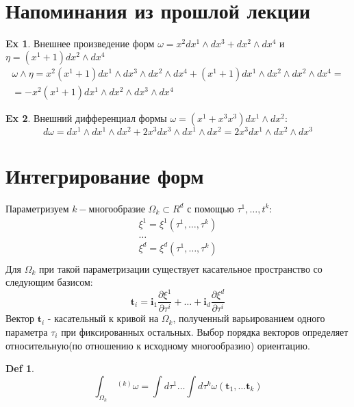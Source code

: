 \documentclass{article}
\theoremstyle{definition}
\newtheorem{defn}{Def}
\newtheorem{example}{Ex}
\begin{document}
\section*{Напоминания из прошлой лекции}
\begin{example} Внешнее произведение форм $\omega = x^2 dx^1 \wedge dx^3 + dx^2 \wedge dx^4$ и $\eta = (x^1+1)dx^2 \wedge dx^4$
\begin{multline*}
\omega \wedge \eta = x^2 (x^1+1)dx^1 \wedge dx^3 \wedge dx^2 \wedge dx^4 + (x^1+1)dx^1\wedge dx^2 \wedge dx^2 \wedge dx^4 =\\=
-x^2(x^1+1) dx^1 \wedge dx^2 \wedge dx^3 \wedge dx^4
\end{multline*}
\end{example}
\begin{example}
	Внешний дифференциал формы $\omega = (x^1+x^3 x^3) dx^1 \wedge dx^2$:
	\begin{equation*}
	d\omega = dx^1 \wedge dx^1 \wedge dx^2 + 2x^3 dx^3\wedge dx^1 \wedge dx^2 = 2x^3 dx^1\wedge dx^2 \wedge dx^3
	\end{equation*}
\end{example}
\section*{Интегрирование форм}
Параметризуем $k-$многообразие $\Omega_k \subset R^d$ с помощью $\tau^1, \dots, t^k:$
\begin{gather}
	\xi^1 = \xi^1(\tau^1, \dots, \tau^k)\\	
	\dots \\
	\xi^d = \xi^d(\tau^1, \dots, \tau^k)\\
\end{gather}
Для $\Omega_k$ при такой параметризации существует касательное пространство со следующим базисом:
\begin{equation*}
\mathbf{t}_i = \mathbf{i}_1 \frac{\partial \xi^1}{\partial \tau^i} + \dots + \mathbf{i}_d \frac{\partial \xi^d}{\partial \tau^i}
\end{equation*}
Вектор $\mathbf{t}_i$ - касательный к кривой на $\Omega_k$, полученный варьированием одного параметра $\tau_i$ при фиксированных остальных. Выбор порядка векторов определяет относительную(по отношению к исходному многообразию) ориентацию.
\begin{defn}
	\begin{equation}
	\int_{\Omega_k}  \ ^{(k)} \omega = \int d \tau^1 \dots \int d \tau^k \omega(\mathbf{t}_1, \dots \mathbf{t}_k)
	\end{equation}
\end{defn}
\end{document}
